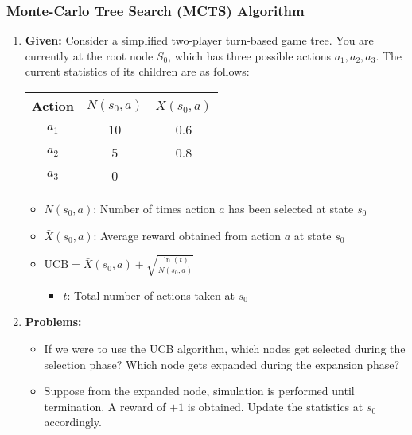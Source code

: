 \subsubsection{Monte-Carlo Tree Search (MCTS) Algorithm}
\begin{example}
    \begin{enumerate}
        \item \textbf{Given:} Consider a simplified two-player turn-based game tree. You are currently at the root node $S_0$, which has three possible actions $a_1, a_2, a_3$. The current statistics of its children are as follows:
        \vspace{1em}
        \begin{center}
        \begin{tabular}{ccc}
        \toprule
        \textbf{Action} & $N(s_0, a)$ & $\bar{X}(s_0, a)$ \\
        \midrule
        $a_1$ & 10 & 0.6 \\
        $a_2$ & 5 & 0.8 \\
        $a_3$ & 0 & -- \\
        \bottomrule
        \end{tabular}
        \end{center}
        \vspace{1em}
        \begin{itemize}
            \item $N(s_0, a)$: Number of times action $a$ has been selected at state $s_0$
            \item $\bar{X}(s_0, a)$: Average reward obtained from action $a$ at state $s_0$
            \item $\text{UCB} = \bar{X}(s_0, a) + \sqrt{\frac{\ln(t)}{N(s_0, a)}}$ 
            \begin{itemize}
                \item $t$: Total number of actions taken at $s_0$
            \end{itemize}
        \end{itemize}
        \item \textbf{Problems:} 
        \begin{itemize}
            \item If we were to use the UCB algorithm, which nodes get selected during the selection phase? Which node gets expanded during the expansion phase?
            \item Suppose from the expanded node, simulation is performed until termination. A reward of $+1$ is obtained. Update the statistics at $s_0$ accordingly.

\end{itemize}
\end{enumerate}
\end{example}
